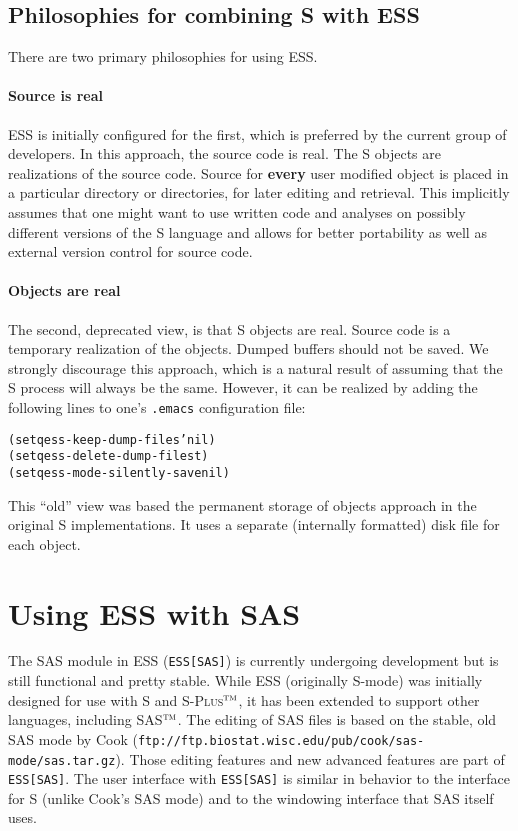 \documentclass{article}
\newcommand*{\Splus}{\textsc{S-Plus}}
\newcommand{\tm}{$^{\mbox{\scriptsize\sc tm}}$}
\newenvironment{Salltt}{\small\begin{alltt}}{\end{alltt}}
\begin{document}
\subsection{Philosophies for combining S with ESS}
\label{sec:S:philosophy}

There are two primary philosophies for using ESS.   
\paragraph{Source is real}
ESS is initially
configured for the first, which is
preferred by the current group of developers.
In this approach, the source code is real.  The S objects
are realizations of the source code.  Source for \textbf{every} user
modified object is placed in a particular directory or directories,
for later editing and retrieval.  This implicitly assumes that one
might want to use written code and analyses on possibly different
versions of the S language and allows for better portability as well
as external version control for source code.

\paragraph{Objects are real}
The second, deprecated view, is that S objects are real.  Source code
is a temporary realization of the objects.  Dumped buffers
should not be saved.  We strongly discourage this approach, which is a
natural result of assuming that the S process will always be the same.
However, it can be realized by adding the following lines to one's
\texttt{.emacs} configuration file:
\begin{Salltt}
  (setq ess-keep-dump-files 'nil)
  (setq ess-delete-dump-files t)
  (setq ess-mode-silently-save nil)
\end{Salltt}
This ``old'' view was based the permanent storage of objects approach
in the original S implementations.  It uses a separate (internally formatted)
disk file for each object.


\section{Using ESS with SAS}
\label{sec:SAS}

The SAS module in ESS ({\tt ESS[SAS]}) is currently undergoing development
but is still functional and pretty stable.  While ESS (originally
S-mode) was initially designed for use with S and \Splus\tm, it has
been extended to support other languages, including SAS\tm.  The
editing of SAS files is based on the stable, old SAS mode by Cook
({\tt ftp://ftp.biostat.wisc.edu/pub/cook/sas-mode/sas.tar.gz}).  Those
editing features and new advanced features are part of {\tt ESS[SAS]}.  The
user interface with {\tt ESS[SAS]} is similar in behavior to the interface
for S (unlike Cook's SAS mode) and to the windowing interface that SAS
itself uses.
\end{document}
